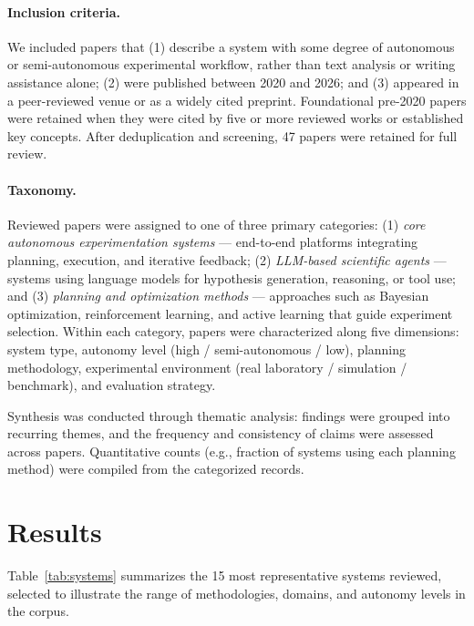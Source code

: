 \documentclass{article}
\begin{document}
\paragraph{Inclusion criteria.}
We included papers that (1) describe a system with some degree of autonomous or semi-autonomous experimental workflow, rather than text analysis or writing assistance alone; (2) were published between 2020 and 2026; and (3) appeared in a peer-reviewed venue or as a widely cited preprint. Foundational pre-2020 papers were retained when they were cited by five or more reviewed works or established key concepts. After deduplication and screening, 47 papers were retained for full review.

\paragraph{Taxonomy.}
Reviewed papers were assigned to one of three primary categories: (1) \textit{core autonomous experimentation systems} — end-to-end platforms integrating planning, execution, and iterative feedback; (2) \textit{LLM-based scientific agents} — systems using language models for hypothesis generation, reasoning, or tool use; and (3) \textit{planning and optimization methods} — approaches such as Bayesian optimization, reinforcement learning, and active learning that guide experiment selection. Within each category, papers were characterized along five dimensions: system type, autonomy level (high / semi-autonomous / low), planning methodology, experimental environment (real laboratory / simulation / benchmark), and evaluation strategy.

Synthesis was conducted through thematic analysis: findings were grouped into recurring themes, and the frequency and consistency of claims were assessed across papers. Quantitative counts (e.g., fraction of systems using each planning method) were compiled from the categorized records.

\section{Results}
\label{sec:results}

Table~\ref{tab:systems} summarizes the 15 most representative systems reviewed, selected to illustrate the range of methodologies, domains, and autonomy levels in the corpus.
\end{document}
